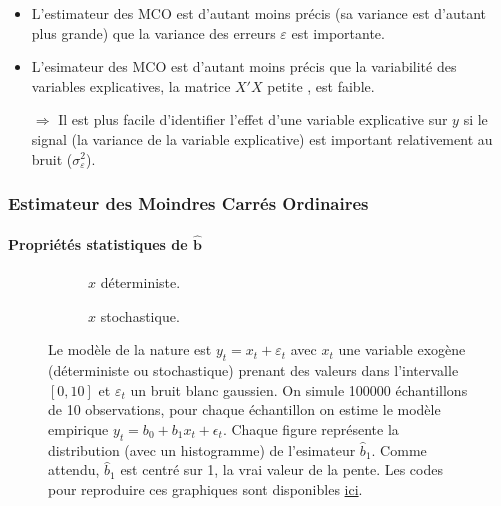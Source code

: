 \documentclass[10pt]{beamer}
\theoremstyle{plain}
\begin{document}
\begin{notes}
  \begin{itemize}
  \item L'estimateur des MCO est d'autant moins précis (sa variance est d'autant plus grande) que la variance des erreurs $\varepsilon$ est importante.\newline

  \item L'esimateur des MCO est d'autant moins précis que la variabilité des variables explicatives, la matrice $X'X$ \og petite \fg, est faible.\newline

  \item[$\Rightarrow$] Il est plus facile d'identifier l'effet d'une variable explicative sur $y$ si le signal (la variance de la variable explicative) est important relativement au bruit ($\sigma_{\varepsilon}^2$).
  \end{itemize}

\end{notes}


\begin{frame}
  \frametitle{Estimateur des Moindres Carrés Ordinaires}
  \framesubtitle {Propriétés statistiques de $\hat{\mathbf b}$}

  \begin{figure}
    \centering
    \begin{subfigure}{0.4\textwidth}
      \scalebox{.3}{
    }
    \caption{$x$ déterministe.}
    \label{fig:01:a}
  \end{subfigure}
  \hfill
  \begin{subfigure}{0.4\textwidth}
    \scalebox{.3}{
    }
    \caption{$x$ stochastique.}
    \label{fig:01:b}
  \end{subfigure}
  \label{fig:01}
  \caption{Le modèle de la nature est $y_t = x_t + \varepsilon_t$ avec $x_t$ une variable exogène (déterministe ou stochastique) prenant des valeurs dans l'intervalle $[0,10]$ et $\varepsilon_t$ un bruit blanc gaussien. On simule 100000  échantillons de 10 observations, pour chaque échantillon on estime le modèle empirique $y_t = b_0 + b_1 x_t + \epsilon_t$. Chaque figure représente la distribution (avec un histogramme) de l'esimateur $\hat b_1$. Comme attendu,  $\hat b_1$ est centré sur 1, la vrai valeur de la pente.  Les codes pour reproduire ces graphiques sont disponibles \href{https://mnemosyne.ithaca.fr/stephane/econometrics/-/blob/\HEAD/cours/codes/chapitre-1/estimator-with-deterministic-versus-stochastic-samples.py}{ici}.}
\end{figure}
\end{frame}
\end{document}
